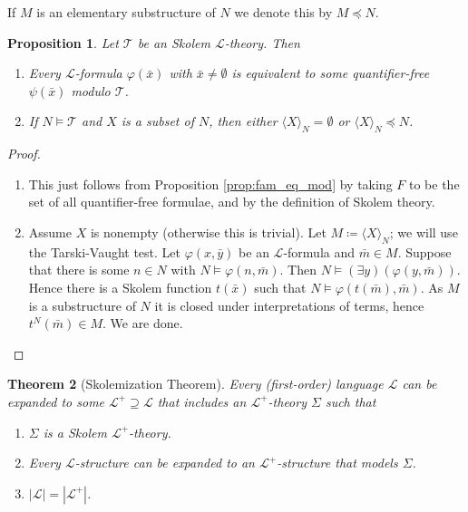 \documentclass{report}
\theoremstyle{definition}
\theoremstyle{plain}
\newtheorem{thm}{Theorem}[section]
\newtheorem{prop}[thm]{Proposition}
\theoremstyle{definition}
\begin{document}
 		If $M$ is an elementary substructure of $N$ we denote this by $M \preccurlyeq N$.
 		\begin{prop}
 			Let $\mathcal{T}$ be an Skolem $\mathcal{L}$-theory. Then
 			\begin{enumerate}[label=(\arabic*)]
 				\item Every $\mathcal{L}$-formula $\varphi(\bar{x})$ with $\bar{x}\neq \emptyset$ is equivalent to some quantifier-free $\psi(\bar{x})$ modulo $\mathcal{T}$.
 				\item If $N \models \mathcal{T}$ and $X$ is a subset of $N$, then either $\langle X \rangle_N = \emptyset$ or $\langle X \rangle_N\preccurlyeq N$.
 			\end{enumerate}
 		\end{prop}
 		\begin{proof}\leavevmode
 			\begin{enumerate}[label=(\arabic*)]
 				\item This just follows from Proposition \ref{prop:fam_eq_mod} by taking $F$ to be the set of all quantifier-free formulae, and by the definition of Skolem theory.
 				\item Assume $X$ is nonempty (otherwise this is trivial). Let $M \coloneqq \langle X \rangle_N$; we will use the Tarski-Vaught test. Let $\varphi(x,\bar{y})$ be an $\mathcal{L}$-formula and $\bar{m}\in M$. Suppose that there is some $n\in N$ with $N \models \varphi(n,\bar{m})$. Then $N \models (\exists y)(\varphi(y,\bar{m}))$. Hence there is a Skolem function $t(\bar{x})$ such that $N \models \varphi(t(\bar{m}), \bar{m})$. As $M$ is a substructure of $N$ it is closed under interpretations  of terms, hence $t^N(\bar{m}) \in M$. We are done.\qedhere
 			\end{enumerate}
 		\end{proof}
 		\begin{thm}[Skolemization Theorem]
 			Every (first-order) language $\mathcal{L}$ can be expanded to some $\mathcal{L}^+ \supseteq \mathcal{L}$ that includes an $\mathcal{L}^+$-theory $\Sigma$ such that
 			\begin{enumerate}[label=(\arabic*)]
 				\item $\Sigma$ is a Skolem $\mathcal{L}^+$-theory.
 				\item Every $\mathcal{L}$-structure can be expanded to an $\mathcal{L}^+$-structure that models $\Sigma$.
 				\item $|\mathcal{L}| = |\mathcal{L}^+|$.
 			\end{enumerate}
 		\end{thm}
\end{document}
